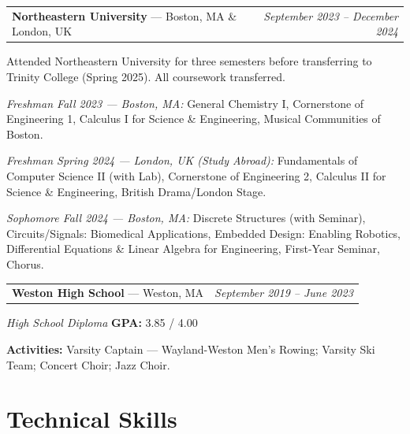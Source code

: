 \documentclass[10pt, letterpaper]{article}
\begin{document}
\vspace{6pt}

\begin{tabularx}{\linewidth}{@{}X r@{}}
  \textbf{Northeastern University} \textnormal{---} Boston, MA \& London, UK &
  \textit{September 2023 -- December 2024}
\end{tabularx}
\vspace{1pt}
Attended Northeastern University for three semesters before transferring to Trinity College
(Spring 2025). All coursework transferred.

\vspace{2pt}
\textit{Freshman Fall 2023 --- Boston, MA:}
General Chemistry I, Cornerstone of Engineering 1, Calculus I for Science \& Engineering,
Musical Communities of Boston.

\vspace{2pt}
\textit{Freshman Spring 2024 --- London, UK (Study Abroad):}
Fundamentals of Computer Science II (with Lab), Cornerstone of Engineering 2,
Calculus II for Science \& Engineering, British Drama/London Stage.

\vspace{2pt}
\textit{Sophomore Fall 2024 --- Boston, MA:}
Discrete Structures (with Seminar), Circuits/Signals: Biomedical Applications,
Embedded Design: Enabling Robotics, Differential Equations \& Linear Algebra for Engineering,
First-Year Seminar, Chorus.

\vspace{6pt}

\begin{tabularx}{\linewidth}{@{}X r@{}}
  \textbf{Weston High School} \textnormal{---} Weston, MA & \textit{September 2019 -- June 2023}
\end{tabularx}
\vspace{1pt}
\textit{High School Diploma} \quad \textbf{GPA:} 3.85 / 4.00

\vspace{2pt}
\textbf{Activities:} Varsity Captain --- Wayland-Weston Men's Rowing;
Varsity Ski Team; Concert Choir; Jazz Choir.

\section{Technical Skills}
\end{document}
